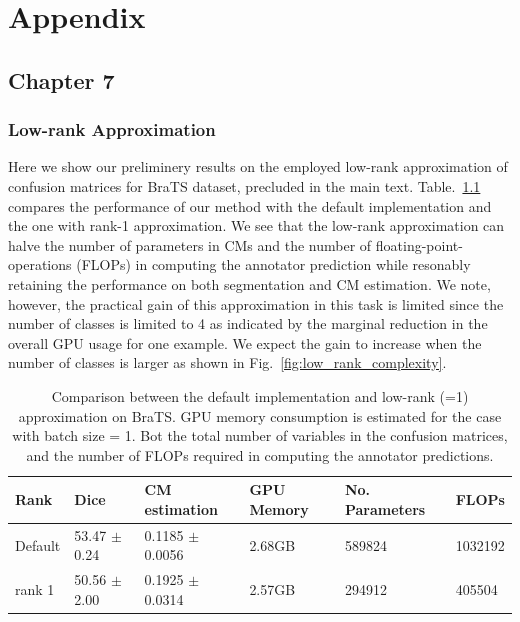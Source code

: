 \chapter{Appendix} \label{sec:appendix}

\section{Chapter 7}
\subsection{Low-rank Approximation}\label{Appendix low rank}
Here we show our preliminery results on the employed low-rank approximation of confusion matrices for BraTS dataset, precluded in the main text. Table.~\ref{low_rank_result} compares the performance of our method with the default implementation and the one with rank-1 approximation. We see that the low-rank approximation can halve the number of parameters in CMs and the number of floating-point-operations (FLOPs) in computing the annotator prediction while resonably retaining the performance on both segmentation and CM estimation. We note, however, the practical gain of this approximation in this task is limited since the number of classes is limited to 4 as indicated by the marginal reduction in the overall GPU usage for one example. We expect the gain to increase when the number of classes is larger as shown in Fig.~\ref{fig:low_rank_complexity}. 

\begin{table}[H]
	\center
	\footnotesize
	\begin{tabular}{@{}llllll}
		\hline
		 Rank & Dice & CM estimation & GPU Memory & No. Parameters &  FLOPs   \\
		\hline	
		Default  & 53.47 $\pm $ 0.24  & 0.1185 $\pm$ 0.0056   & 2.68GB &  589824 &  1032192  \\
		rank 1 & 50.56 $\pm$ 2.00  & 0.1925 $\pm$ 0.0314 & 2.57GB  &    294912    & 405504\\
		\hline
	\end{tabular}%
	\vspace{2mm}
\caption{\footnotesize Comparison between the default implementation and low-rank (=1) approximation on BraTS. GPU memory consumption is estimated for the case with batch size = 1. Bot the total number of variables in the confusion matrices, and the number of FLOPs required in computing the annotator predictions. }
\label{low_rank_result}
\end{table}

